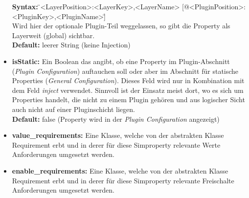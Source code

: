 \documentclass[a4paper, 11pt]{article} %
\begin{document}
\begin{itemize}
	\textbf{Syntax:} \"{}<LayerPosition>:<LayerKey>,<LayerName> [@<PluginPosition>:<PluginKey>,<PluginName>]\"{}\\
	Wird hier der optionale Plugin-Teil weggelassen, so gibt die Property als Layerweit (global) sichtbar.\\
	\textbf{Default:} leerer String (keine Injection)
	\item \textbf{isStatic:} Ein Boolean das angibt, ob eine Property im Plugin-Abschnitt (\emph{Plugin Configuration}) auftauchen soll oder aber im Abschnitt für statische Properties (\emph{General Configuration}). Dieses Feld wird nur in Kombination mit dem Feld \emph{inject} verwendet. Sinnvoll ist der Einsatz meist dort, wo es sich um Properties handelt, die nicht zu einem Plugin gehören und aus logischer Sicht auch nicht auf einer Pluginschicht liegen.\\
	\textbf{Default:} false (Property wird in der \emph{Plugin Configuration} angezeigt)
	\item \textbf{value\_requirements:} Eine Klasse, welche von der abstrakten Klasse Requirement erbt und in derer für diese Simproperty relevante Werte Anforderungen umgesetzt werden.
	\item \textbf{enable\_requirements:} Eine Klasse, welche von der abstrakten Klasse Requirement erbt und in derer für diese Simproperty relevante Freischalte Anforderungen umgesetzt werden.
\end{itemize}
\end{document}
